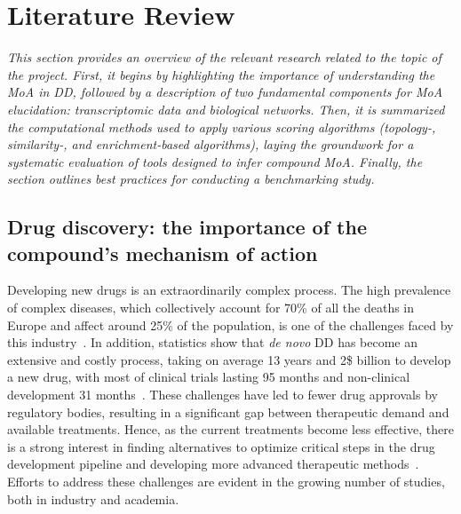 ﻿%

%

\chapter{Literature Review}
\label{cha:literaturereview}

\textit{This section provides an overview of the relevant research related to the topic of the project.
First, it begins by highlighting the importance of understanding the \gls{MoA} in \gls{DD}, followed by a description of two fundamental components for \gls{MoA} elucidation: transcriptomic data and biological networks.
Then, it is summarized the computational methods used to apply various scoring algorithms (topology-, similarity-, and enrichment-based algorithms), laying the groundwork for a systematic evaluation of tools designed to infer compound \gls{MoA}.
Finally, the section outlines best practices for conducting a benchmarking study.}

\section{Drug discovery: the importance of the compound's mechanism of action} %
\label{sec:drugdiscoverytheimportanceofthecompoundsmechanismofaction}

Developing new drugs is an extraordinarily complex process.
The high prevalence of complex diseases, which collectively account for 70\% of all the deaths in Europe and affect around 25\% of the population, is one of the challenges faced by this industry~\cite{RN43}.
In addition, statistics show that \textit{de novo} \gls{DD} has become an extensive and costly process, taking on average 13 years and 2\$ billion to develop a new drug, with most of clinical trials lasting 95 months and non-clinical development 31 months~\cite{RN55,RN56,RN47}.
These challenges have led to fewer drug approvals by regulatory bodies, resulting in a significant gap between therapeutic demand and available treatments. Hence, as the current treatments become less effective, there is a strong interest in finding alternatives to optimize critical steps in the drug development pipeline and developing more advanced therapeutic methods~\cite{RN44}.
Efforts to address these challenges are evident in the growing number of studies, both in industry and academia.


